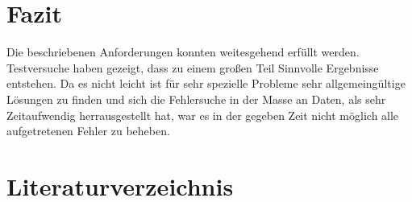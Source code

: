 \documentclass[a4paper, 12pt]{article}
\begin{document}
\section{Fazit}
Die beschriebenen Anforderungen konnten weitesgehend erfüllt werden. Testversuche haben gezeigt, dass zu einem großen Teil Sinnvolle Ergebnisse entstehen. Da es nicht leicht ist für sehr spezielle Probleme sehr allgemeingültige Lösungen zu finden und sich die Fehlersuche in der Masse an Daten, als sehr Zeitaufwendig herrausgestellt hat, war es in der gegeben Zeit nicht möglich alle aufgetretenen Fehler zu beheben.


	\newpage
\section{Literaturverzeichnis}
\setlength{\emergencystretch}{3em}
\printbibliography
\end{document}

